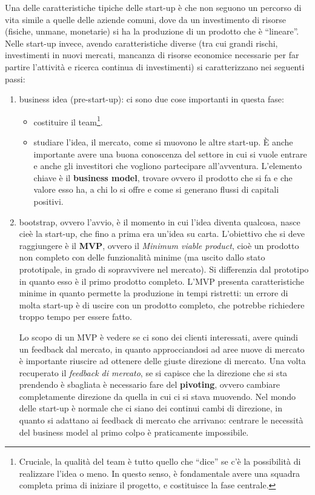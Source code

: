 \noindent Una delle caratteristiche tipiche delle start-up è che non seguono un
percorso di vita simile a quelle delle aziende comuni, dove da un investimento
di risorse (fisiche, unmane, monetarie) si ha la produzione di un prodotto che è
``lineare''.
Nelle start-up invece, avendo caratteristiche diverse (tra cui grandi rischi,
investimenti in nuovi mercati, mancanza di risorse economice necessarie per
far partire l'attività e ricerca continua di investimenti) si caratterizzano
nei seguenti passi:
\begin{enumerate}
 \item business idea (pre-start-up): ci sono due cose importanti in questa fase:
 \begin{itemize}
  \item costituire il team\footnote{Cruciale, la qualità del team è tutto
quello che ``dice'' se c'è la possibilità di realizzare l'idea o meno. In
questo senso, è fondamentale avere una squadra completa prima di iniziare il
progetto, e costituisce la fase centrale.}.
  \item studiare l'idea, il mercato, come si muovono le altre start-up. È anche
importante avere una buona conoscenza del settore in cui si vuole entrare e
anche gli investitori che vogliono partecipare all'avventura. L'elemento chiave
è il \textbf{business model}, trovare ovvero il prodotto che si fa e che valore
esso ha, a chi lo si offre e come si generano flussi di capitali positivi.
 \end{itemize}
 \item bootstrap, ovvero l'avvio, è il momento in cui l'idea diventa qualcosa,
nasce cieè la start-up, che fino a prima era un'idea su carta. L'obiettivo che
si deve raggiungere è il \textbf{MVP}, ovvero il \textit{Minimum viable
product}, cioè un prodotto non completo con delle funzionalità minime (ma
uscito dallo stato prototipale, in grado di sopravvivere nel mercato). Si
differenzia dal prototipo in quanto esso è il primo prodotto completo. L'MVP
presenta caratteristiche minime in quanto permette la produzione in tempi
ristretti: un errore di molta start-up è di uscire con un prodotto completo,
che potrebbe richiedere troppo tempo per essere fatto.

Lo scopo di un MVP è vedere se ci sono dei clienti interessati, avere quindi un
feedback dal mercato, in quanto approcciandosi ad aree nuove di mercato è
importante riuscire ad ottenere delle giuste direzione di mercato. Una volta
recuperato il \textit{feedback di mercato}, se si capisce che la direzione che
si sta prendendo è sbagliata è necessario fare del \textbf{pivoting}, ovvero
cambiare completamente direzione da quella in cui ci si stava muovendo. Nel
mondo delle start-up è normale che ci siano dei continui cambi di direzione, in
quanto si adattano ai feedback di mercato che arrivano: centrare le necessità
del business model al primo colpo è praticamente impossibile.


\end{enumerate}
